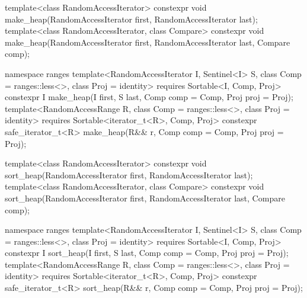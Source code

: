 \begin{codeblock}
  template<class RandomAccessIterator>
    constexpr void make_heap(RandomAccessIterator first, RandomAccessIterator last);
  template<class RandomAccessIterator, class Compare>
    constexpr void make_heap(RandomAccessIterator first, RandomAccessIterator last,
                             Compare comp);
\end{codeblock}\begin{addedblock}\begin{codeblock}
  namespace ranges {
    template<RandomAccessIterator I, Sentinel<I> S, class Comp = ranges::less<>,
        class Proj = identity>
      requires Sortable<I, Comp, Proj>
      constexpr I
        make_heap(I first, S last, Comp comp = Comp{}, Proj proj = Proj{});
    template<RandomAccessRange R, class Comp = ranges::less<>, class Proj = identity>
      requires Sortable<iterator_t<R>, Comp, Proj>
      constexpr safe_iterator_t<R>
        make_heap(R&& r, Comp comp = Comp{}, Proj proj = Proj{});
  }
\end{codeblock}\end{addedblock}\begin{codeblock}

  template<class RandomAccessIterator>
    constexpr void sort_heap(RandomAccessIterator first, RandomAccessIterator last);
  template<class RandomAccessIterator, class Compare>
    constexpr void sort_heap(RandomAccessIterator first, RandomAccessIterator last,
                             Compare comp);
\end{codeblock}\begin{addedblock}\begin{codeblock}
  namespace ranges {
    template<RandomAccessIterator I, Sentinel<I> S, class Comp = ranges::less<>,
        class Proj = identity>
      requires Sortable<I, Comp, Proj>
      constexpr I
        sort_heap(I first, S last, Comp comp = Comp{}, Proj proj = Proj{});
    template<RandomAccessRange R, class Comp = ranges::less<>, class Proj = identity>
      requires Sortable<iterator_t<R>, Comp, Proj>
      constexpr safe_iterator_t<R>
        sort_heap(R&& r, Comp comp = Comp{}, Proj proj = Proj{});
  }
\end{codeblock}\end{addedblock}\begin{codeblock}


\end{codeblock}
